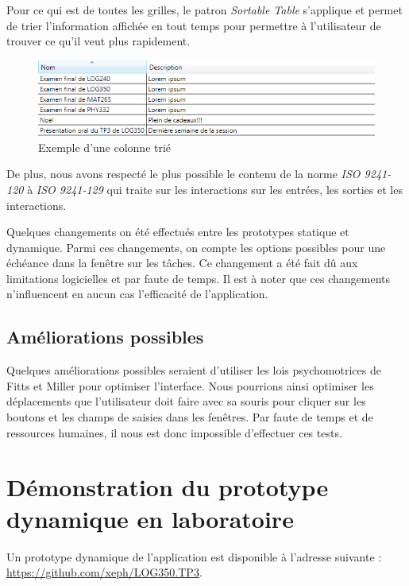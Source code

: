 \documentclass[letterpaper, oneside, 12pt, these, creativecommons]{thETS}
\begin{document}
Pour ce qui est de toutes les grilles, le patron \emph{Sortable Table} s'applique et permet de trier l'information affichée en tout temps pour permettre à l'utilisateur de trouver ce qu'il veut plus rapidement.

\begin{figure}[H!]
	\centering
	\includegraphics[width=1\textwidth]{sortable_table.png}
	\caption{Exemple d'une colonne trié}
\end{figure}

De plus, nous avons respecté le plus possible le contenu de la norme \emph{ISO 9241-120} à \emph{ISO 9241-129} qui traite sur les interactions sur les entrées, les sorties et les interactions.

Quelques changements on été effectués entre les prototypes statique et dynamique. Parmi ces changements, on compte les options possibles pour une échéance dans la fenêtre sur les tâches. Ce changement a été fait dû aux limitations logicielles et par faute de temps. Il est à noter que ces changements n'influencent en aucun cas l'efficacité de l'application.

\section{Améliorations possibles}

Quelques améliorations possibles seraient d'utiliser les lois psychomotrices de Fitts et Miller pour optimiser l'interface. Nous pourrions ainsi optimiser les déplacements que l'utilisateur doit faire avec sa souris pour cliquer sur les boutons et les champs de saisies dans les fenêtres. Par faute de temps et de ressources humaines, il nous est donc impossible d'effectuer ces tests.

\chapter{Démonstration du prototype dynamique en laboratoire}

Un prototype dynamique de l'application est disponible à l'adresse suivante : \\
\url{https://github.com/xeph/LOG350.TP3}.
\end{document}
